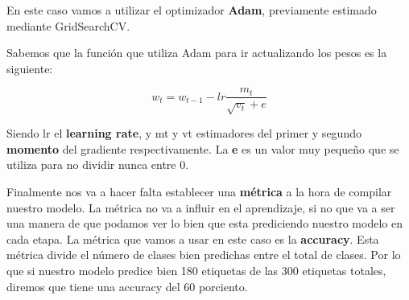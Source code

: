 En este caso vamos a utilizar el optimizador \textbf{Adam}\cite{adam}, previamente estimado mediante GridSearchCV.

\vspace{5 mm}

Sabemos que la función que utiliza Adam para ir actualizando los pesos es la siguiente:

\[w_t = w_{t-1} - lr  \frac{m_t}{\sqrt{v_t} + e} \]

Siendo lr el \textbf{learning rate}, y mt y vt estimadores del primer y segundo \textbf{momento} del gradiente respectivamente. La \textbf{e} es un valor muy pequeño que se utiliza para no dividir nunca entre 0.

\vspace{5 mm}

Finalmente nos va a hacer falta establecer una \textbf{métrica} a la hora de compilar nuestro modelo. La métrica no va a influir en el aprendizaje, si no que va a ser una manera de que podamos ver lo bien que esta prediciendo nuestro modelo en cada etapa. La métrica que vamos a usar en este caso es la \textbf{accuracy}. Esta métrica divide el número de clases bien predichas entre el total de clases. Por lo que si nuestro modelo predice bien 180 etiquetas de las 300 etiquetas totales, diremos que tiene una accuracy del 60 porciento.
